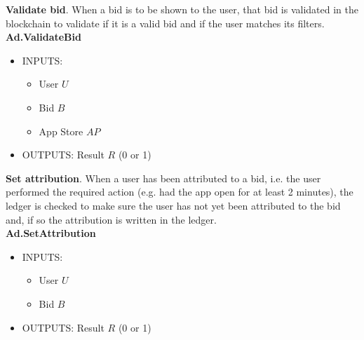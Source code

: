 \noindent \textbf{Validate bid}. When a bid is to be shown to the user, that bid is validated in the blockchain to validate if it is a valid bid and if the user matches its filters. \\

\textbf{Ad.ValidateBid}
\vspace{-0.35cm}
\begin{itemize}
	\item INPUTS:
	\vspace{-0.35cm}
	\begin{itemize}
		\item User $U$
		\item Bid $B$
		\item App Store $AP$
	\end{itemize}
	\item OUTPUTS: Result $R$ (0 or 1)
\end{itemize}

\noindent \textbf{Set attribution}. When a user has been attributed to a bid, i.e. the user performed the required action (e.g. had the app open for at least 2 minutes), the ledger is checked to make sure the user has not yet been attributed to the bid and, if so the attribution is written in the ledger. \\

\textbf{Ad.SetAttribution}
\vspace{-0.35cm}
\begin{itemize}
	\item INPUTS:
	\vspace{-0.35cm}
	\begin{itemize}
		\item User $U$
		\item Bid $B$
	\end{itemize}
	\item OUTPUTS: Result $R$ (0 or 1)
\end{itemize}











			